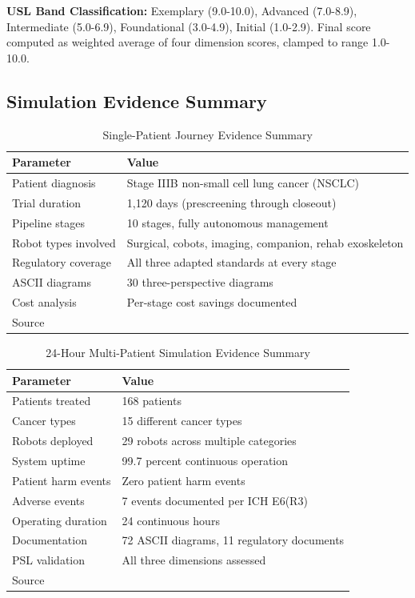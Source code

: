 \noindent\textbf{USL Band Classification:} Exemplary (9.0-10.0), Advanced
(7.0-8.9), Intermediate (5.0-6.9), Foundational (3.0-4.9), Initial (1.0-2.9).
Final score computed as weighted average of four dimension scores, clamped to
range 1.0-10.0.

\newpage

\subsection{Simulation Evidence Summary}
\label{app:simulation}

\begin{table}[H]
\centering
\caption{Single-Patient Journey Evidence Summary}
\label{tab:single-patient}
\small
\begin{tabularx}{\textwidth}{l X}
\toprule
\textbf{Parameter} & \textbf{Value} \\
\midrule
Patient diagnosis & Stage IIIB non-small cell lung cancer (NSCLC) \\
Trial duration & 1,120 days (prescreening through closeout) \\
Pipeline stages & 10 stages, fully autonomous management \\
Robot types involved & Surgical, cobots, imaging, companion, rehab exoskeleton \\
Regulatory coverage & All three adapted standards at every stage \\
ASCII diagrams & 30 three-perspective diagrams \\
Cost analysis & Per-stage cost savings documented \\
Source & \cite{patient-journey-paper} \\
\bottomrule
\end{tabularx}
\end{table}

\begin{table}[H]
\centering
\caption{24-Hour Multi-Patient Simulation Evidence Summary}
\label{tab:multi-patient}
\small
\begin{tabularx}{\textwidth}{l X}
\toprule
\textbf{Parameter} & \textbf{Value} \\
\midrule
Patients treated & 168 patients \\
Cancer types & 15 different cancer types \\
Robots deployed & 29 robots across multiple categories \\
System uptime & 99.7 percent continuous operation \\
Patient harm events & Zero patient harm events \\
Adverse events & 7 events documented per ICH E6(R3) \\
Operating duration & 24 continuous hours \\
Documentation & 72 ASCII diagrams, 11 regulatory documents \\
PSL validation & All three dimensions assessed \\
Source & \cite{site-docs} \\
\bottomrule
\end{tabularx}
\end{table}
